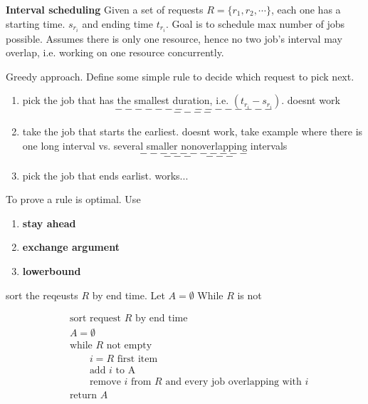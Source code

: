 \documentclass[11pt]{article}
\begin{document}
\begin{example}
  \textbf{Interval scheduling} Given a set of requests $R = \{ r_1, r_2, \cdots \}$, each one has a starting time. $s_{r_i}$ and ending time $t_{r_i}$. Goal is to schedule max number of jobs possible. Assumes there is only one resource, hence no two job's interval may overlap, i.e. working on one resource concurrently.
  \begin{approach}
    Greedy approach. Define some simple rule to decide which request to pick next.
    \begin{enumerate}
      \item pick the job that has the smallest duration, i.e. $(t_{r_i} - s_{r_i})$. doesnt work
      \[
        -------\quad--------
      \]
      \[
        ----
      \]
      \item take the job that starts the earliest. doesnt work, take example where there is one long interval vs. several smaller nonoverlapping intervals
      \[
        -----------
      \]
      \[
        \quad--- \quad ---
      \]
      \item pick the job that ends earlist. works...
    \end{enumerate}
    To prove a rule is optimal. Use
    \begin{enumerate}
      \item \textbf{stay ahead}
      \item \textbf{exchange argument}
      \item \textbf{lowerbound}
    \end{enumerate}
  \end{approach}
  \begin{solution}
    sort the reqeusts $R$ by end time. Let $A = \emptyset$ While $R$ is not

    \begin{align*}
      &\text{sort request $R$ by end time}\\
      &A = \emptyset\\
      &\text{while $R$ not empty}\\
      &\quad\quad i = R \text{ first item } \\
      &\quad\quad \text{add $i$ to A} \\
      &\quad\quad \text{remove $i$ from $R$ and every job overlapping with $i$}\\
      &\text{return } A
    \end{align*}


\end{solution}
\end{example}
\end{document}
